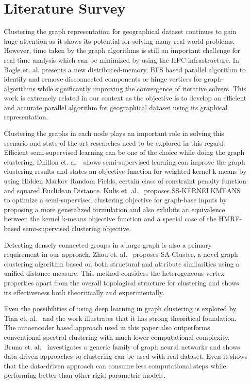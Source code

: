 \section{Literature Survey}
\label{sec:literature_survey}

Clustering the graph representation for geographical dataset continues to gain 
huge attention as it shows its potential for solving many real world problems. 
However, time taken by the graph algorithms is still an important challenge for 
real-time analysis which can be minimized by using the HPC infrastructure.
In~\cite{parallel_graph_algorithm} Bogle et. al. presents a new 
distributed-memory, BFS based parallel algorithm to identify and remove 
disconnected components or hinge vertices for graph-algorithms while 
significantly improving the convergence of iterative solvers. This work is 
extremely related in our context as the objective is to develop an efficient 
and accurate parallel algorithm for geographical dataset using its graphical 
representation.

Clustering the graphs in each node plays an important role in solving this 
scenario and state of the art researches 
need to be explored in this regard. Efficient semi-supervised learning can be 
one of the choice while doing the graph 
clustering.
Dhillon et. al.~\cite{kernel_kmeans} shows semi-supervised learning can improve 
the  graph 
clustering results and states an objective function for weighted kernel k-means 
by using Hidden Markov Random Fields, certain class of constraint penalty 
function and squared Euclidean Distance. 
Kulis et. al.~\cite{semi_supervised_graph_clustering} proposes SS-KERNELKMEANS 
to optimize a semi-supervised clustering objective for graph-base inputs by 
proposing a more generalized formulation and also exhibits an equivalence 
between the kernel k-means objective function
and a special case of the HMRF-based
semi-supervised clustering objective.

Detecting densely connected groups in a large graph is also a primary 
requirement in our approach. Zhou et. 
al.~\cite{structural_attribute_similarity_clustering} proposes SA-Cluster, a 
novel graph clustering algorithm based on both structural and attribute 
similarities using a unified distance measure. This method considers the 
heterogeneous vertex properties apart from the overall topological structure 
for clustering and shows its effectiveness both theoritically and 
experimentally.

Even the possibilities of using deep learning in graph clustering is explored 
by Tian et. al.~\cite{deep_representation_graph_clustering} and the work 
illustrates that it has strong theoritical foundation. The autoencoder based 
approach used in this paper also outperforms conventional spectral clustering 
with much lower computational complexity.
Bruna et. al.~\cite{community_detection} investigates a generic family of graph 
neural networks and shows data-driven approaches to clustering can be used with 
real dataset. Even it shows that the data-driven approach can consume less 
computational steps while performing better than other rigid parametric models.
